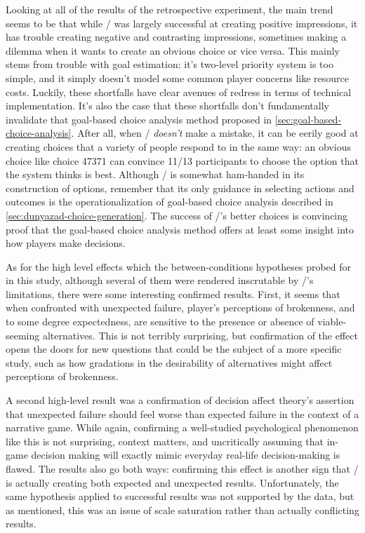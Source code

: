 Looking at all of the results of the retrospective experiment, the main trend seems to be that while \dunyazad/ was largely successful at creating positive impressions, it has trouble creating negative and contrasting impressions, sometimes making a dilemma when it wants to create an obvious choice or vice versa.
%
This mainly stems from trouble with goal estimation: it's two-level priority system is too simple, and it simply doesn't model some common player concerns like resource costs.
%
Luckily, these shortfalls have clear avenues of redress in terms of technical implementation.
%
It's also the case that these shortfalls don't fundamentally invalidate that goal-based choice analysis method proposed in \cref{sec:goal-based-choice-analysis}.
%
After all, when \dunyazad/ \emph{doesn't} make a mistake, it can be eerily good at creating choices that a variety of people respond to in the same way: an obvious choice like choice 47371 can convince 11/13 participants to choose the option that the system thinks is best.
%
Although \dunyazad/ is somewhat ham-handed in its construction of options, remember that its only guidance in selecting actions and outcomes is the operationalization of goal-based choice analysis described in \cref{sec:dunyazad-choice-generation}.
%
The success of \dunyazad/'s better choices is convincing proof that the goal-based choice analysis method offers at least some insight into how players make decisions.


As for the high level effects which the between-conditions hypotheses probed for in this study, although several of them were rendered inscrutable by \dunyazad/'s limitations, there were some interesting confirmed results.
%
First, it seems that when confronted with unexpected failure, player's perceptions of brokenness, and to some degree expectedness, are sensitive to the presence or absence of viable-seeming alternatives.
%
This is not terribly surprising, but confirmation of the effect opens the doors for new questions that could be the subject of a more specific study, such as how gradations in the desirability of alternatives might affect perceptions of brokenness.


A second high-level result was a confirmation of decision affect theory's assertion that unexpected failure should feel worse than expected failure \citep{Mellers1999} in the context of a narrative game.
%
While again, confirming a well-studied psychological phenomenon like this is not surprising, context matters, and uncritically assuming that in-game decision making will exactly mimic everyday real-life decision-making is flawed.
%
The results also go both ways: confirming this effect is another sign that \dunyazad/ is actually creating both expected and unexpected results.
%
Unfortunately, the same hypothesis applied to successful results was not supported by the data, but as mentioned, this was an issue of scale saturation rather than actually conflicting results.



